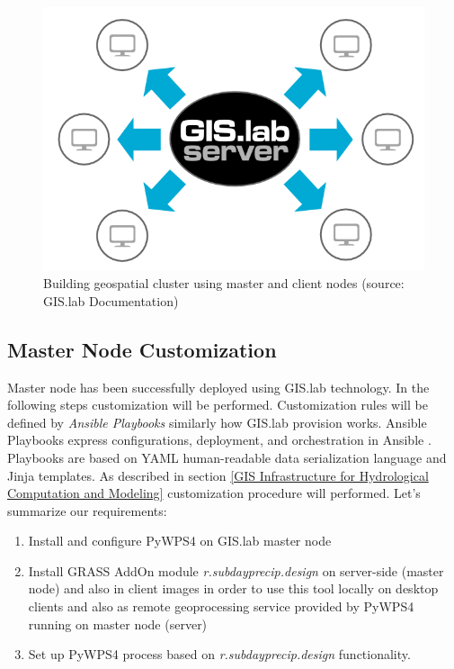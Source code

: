 \documentclass{isprs}
\begin{document}
\begin{figure}[ht!]
\begin{center}
  \includegraphics[width=1.0\columnwidth]{figures/gislab-machines-launch.png}
  \caption{Building geospatial cluster using master and client nodes
    (source: GIS.lab Documentation)}
\label{fig:gislab_infrastructure}
\end{center}
\end{figure}

\subsection{Master Node Customization}

Master node has been successfully deployed using GIS.lab
technology. In the following steps customization will be
performed. Customization rules will be defined by \textit{Ansible
  Playbooks} similarly how GIS.lab provision works. Ansible Playbooks
express configurations, deployment, and orchestration in Ansible
\cite{shah2015ansible}. Playbooks are based on YAML human-readable
data serialization language and Jinja templates. As described in
section \ref{GIS Infrastructure for Hydrological Computation and
  Modeling} customization procedure will performed. Let's summarize
our requirements:

\begin{enumerate}
\setlength\itemsep{0em}\setlength\parskip{0em}\setlength\topsep{0em}\setlength\partopsep{0em}\setlength\parsep{0em}
\item{Install and configure PyWPS4 on GIS.lab master node}
\item{Install GRASS AddOn module \textit{r.subdayprecip.design} on
    server-side (master node) and also in client images in order to
    use this tool locally on desktop clients and also as remote
    geoprocessing service provided by PyWPS4 running on master node
    (server)}
\item{Set up PyWPS4 process based on \textit{r.subdayprecip.design}
  functionality.}
\end{enumerate}
\end{document}
